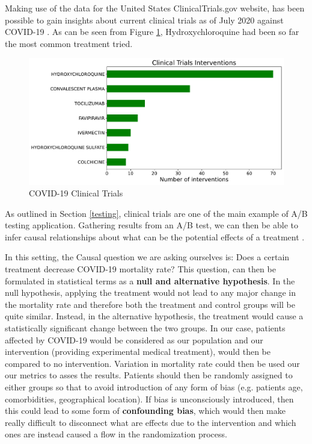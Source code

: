 Making use of the data for the United States ClinicalTrials.gov website, has been possible to gain insights about current clinical trials as of July 2020 against COVID-19 \cite{trials_data}. As can be seen from Figure \ref{trials}, Hydroxychloroquine had been so far the most common treatment tried.
\vspace{-0.2cm}
\begin{figure}[ht!]%
    \centering
    \includegraphics[width=0.65\linewidth]{latex/images/trials.pdf}
    \vspace{-0.2cm}
    \caption{COVID-19 Clinical Trials}
    \label{trials}
\end{figure}
\vspace{-0.2cm}

As outlined in Section \ref{testing}, clinical trials are one of the main example of A/B testing application. Gathering results from an A/B test, we can then be able to infer causal relationships about what can be the potential effects of a treatment \cite{power}.

In this setting, the Causal question we are asking ourselves is: Does a certain treatment decrease COVID-19 mortality rate? This question, can then be formulated in statistical terms as a \textbf{null and alternative hypothesis}. In the null hypothesis, applying the treatment would not lead to any major change in the mortality rate and therefore both the treatment and control groups will be quite similar. Instead, in the alternative hypothesis, the treatment would cause a statistically significant change between the two groups. In our case, patients affected by COVID-19 would be considered as our population and our intervention (providing experimental medical treatment), would then be compared to no intervention. Variation in mortality rate could then be used our our metrics to asses the results. Patients should then be randomly assigned to either groups so that to avoid introduction of any form of bias (e.g. patients age, comorbidities, geographical location). If bias is unconsciously introduced, then this could lead to some form of \textbf{confounding bias}, which would then make really difficult to disconnect what are effects due to the intervention and which ones are instead caused a flow in the randomization process. 

